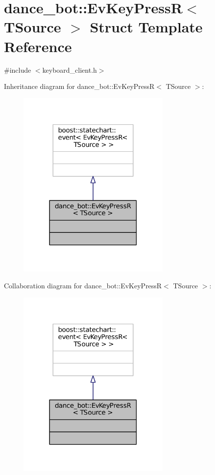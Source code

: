 \hypertarget{structdance__bot_1_1EvKeyPressR}{}\section{dance\+\_\+bot\+:\+:Ev\+Key\+PressR$<$ T\+Source $>$ Struct Template Reference}
\label{structdance__bot_1_1EvKeyPressR}


{\ttfamily \#include $<$keyboard\+\_\+client.\+h$>$}



Inheritance diagram for dance\+\_\+bot\+:\+:Ev\+Key\+PressR$<$ T\+Source $>$\+:
\nopagebreak
\begin{figure}[H]
\begin{center}
\leavevmode
\includegraphics[width=213pt]{structdance__bot_1_1EvKeyPressR__inherit__graph}
\end{center}
\end{figure}


Collaboration diagram for dance\+\_\+bot\+:\+:Ev\+Key\+PressR$<$ T\+Source $>$\+:
\nopagebreak
\begin{figure}[H]
\begin{center}
\leavevmode
\includegraphics[width=213pt]{structdance__bot_1_1EvKeyPressR__coll__graph}
\end{center}
\end{figure}


